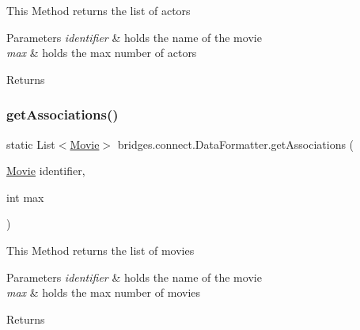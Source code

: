 This Method returns the list of actors 
\begin{DoxyParams}{Parameters}
{\em identifier} & holds the name of the movie \\
\hline
{\em max} & holds the max number of actors \\
\hline
\end{DoxyParams}
\begin{DoxyReturn}{Returns}

\end{DoxyReturn}
\mbox{\label{classbridges_1_1connect_1_1_data_formatter_ad0377b692c07836fb1016e5fb296e79c}} 
\subsubsection{\texorpdfstring{get\+Associations()}{getAssociations()}\hspace{0.1cm}{\footnotesize\ttfamily [5/5]}}
{\footnotesize\ttfamily static List$<$\mbox{\hyperlink{classbridges_1_1data__src__dependent_1_1_movie}{Movie}}$>$ bridges.\+connect.\+Data\+Formatter.\+get\+Associations (\begin{DoxyParamCaption}\item[{\mbox{\hyperlink{classbridges_1_1data__src__dependent_1_1_movie}{Movie}}}]{identifier,  }\item[{int}]{max }\end{DoxyParamCaption})\hspace{0.3cm}{\ttfamily [static]}}

This Method returns the list of movies 
\begin{DoxyParams}{Parameters}
{\em identifier} & holds the name of the movie \\
\hline
{\em max} & holds the max number of movies \\
\hline
\end{DoxyParams}
\begin{DoxyReturn}{Returns}

\end{DoxyReturn}
\mbox{\label{classbridges_1_1connect_1_1_data_formatter_a29cf4c2b0c5629d63a76b60569355c65}} 
